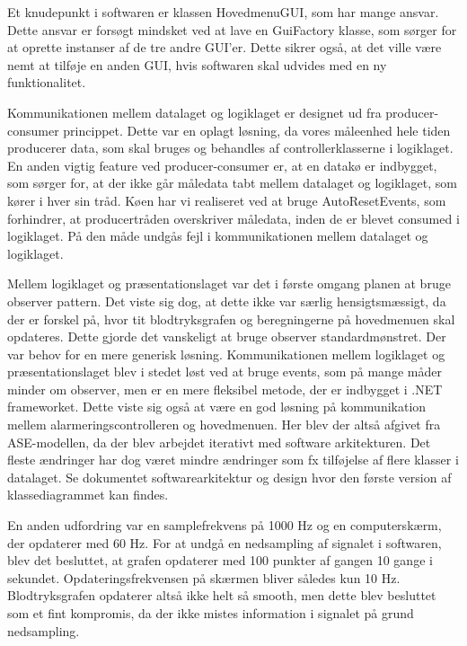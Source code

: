 Et knudepunkt i softwaren er klassen HovedmenuGUI, som har mange ansvar. Dette ansvar er forsøgt mindsket ved at lave en GuiFactory klasse, som sørger for at oprette instanser af de tre andre GUI’er. Dette sikrer også, at det ville være nemt at tilføje en anden GUI, hvis softwaren skal udvides med en ny funktionalitet. 

Kommunikationen mellem datalaget og logiklaget er designet ud fra producer-consumer princippet. Dette var en oplagt løsning, da vores måleenhed hele tiden producerer data, som skal bruges og behandles af controllerklasserne i logiklaget. En anden vigtig feature ved producer-consumer er, at en datakø er indbygget, som sørger for, at der ikke går måledata tabt mellem datalaget og logiklaget, som kører i hver sin tråd. Køen har vi realiseret ved at bruge AutoResetEvents, som forhindrer, at producertråden overskriver måledata, inden de er blevet consumed i logiklaget. På den måde undgås fejl i kommunikationen mellem datalaget og logiklaget.

Mellem logiklaget og præsentationslaget var det i første omgang planen at bruge observer pattern. Det viste sig dog, at dette ikke var særlig hensigtsmæssigt, da der er forskel på, hvor tit blodtryksgrafen og beregningerne på hovedmenuen skal opdateres. Dette gjorde det vanskeligt at bruge observer standardmønstret. Der var behov for en mere generisk løsning. Kommunikationen mellem logiklaget og præsentationslaget blev i stedet løst ved at bruge events, som på mange måder minder om observer, men er en mere fleksibel metode, der er indbygget i .NET frameworket. Dette viste sig også at være en god løsning på kommunikation mellem alarmeringscontrolleren og hovedmenuen. Her blev der altså afgivet fra ASE-modellen, da der blev arbejdet iterativt med software arkitekturen. Det fleste ændringer har dog været mindre ændringer som fx tilføjelse af flere klasser i datalaget. Se dokumentet softwarearkitektur og design hvor den første version af klassediagrammet kan findes.  

En anden udfordring var en samplefrekvens på 1000 Hz og en computerskærm, der opdaterer med 60 Hz. For at undgå en nedsampling af signalet i softwaren, blev det besluttet, at grafen opdaterer med 100 punkter af gangen 10 gange i sekundet. Opdateringsfrekvensen på skærmen bliver således kun 10 Hz. Blodtryksgrafen opdaterer altså ikke helt så smooth, men dette blev besluttet som et fint kompromis, da der ikke mistes information i signalet på grund nedsampling. 
